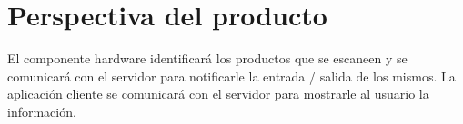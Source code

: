\section{Perspectiva del producto}

El componente hardware identificará los productos que se escaneen y se comunicará con el servidor para notificarle la entrada / salida de los mismos. La aplicación cliente se comunicará con el servidor para mostrarle al usuario la información.
